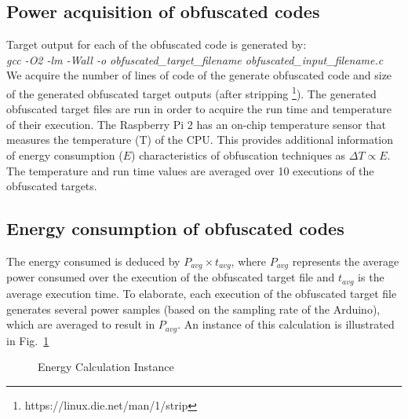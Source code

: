 \subsection{Power acquisition of obfuscated codes}\label{subsec:pdoc}

Target output for each of the obfuscated code is generated by:\\
\textit{gcc -O2 -lm -Wall -o obfuscated\_target\_filename obfuscated\_input\_filename.c}\\
We acquire the number of lines of code of the generate obfuscated code and size of the generated obfuscated target outputs (after stripping \footnote{https://linux.die.net/man/1/strip}). The generated obfuscated target files are run in order to acquire the run time and temperature of their execution. The Raspberry Pi 2 has an on-chip temperature sensor that measures the temperature (T) of the CPU. This provides additional information of energy consumption ($E$) characteristics of obfuscation techniques as $\Delta T \propto E$. The temperature and run time values are averaged over 10 executions of the obfuscated targets.

\subsection{Energy consumption of obfuscated codes}
The energy consumed is deduced by $P_{avg} \times t_{avg}$, where $P_{avg}$ represents the average power consumed over the execution of the obfuscated target file and $t_{avg}$ is the average execution time. To elaborate, each execution of the obfuscated target file generates several power samples (based on the sampling rate of the Arduino), which are averaged to result in $P_{avg}$. An instance of this calculation is illustrated in Fig.~\ref{enercal}
\begin{figure}[t]
  \hspace{-0.2in}
  \caption{Energy Calculation Instance}\label{enercal}
\end{figure}


